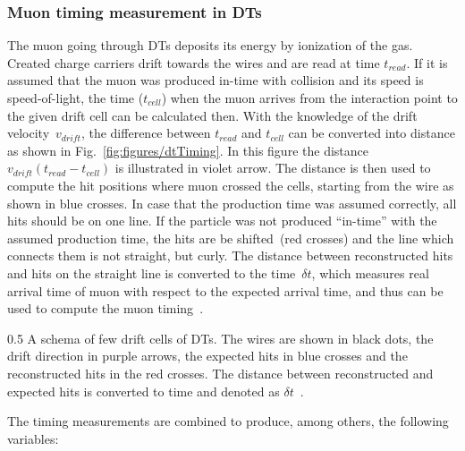 \subsubsection{Muon timing measurement in DTs}

The muon going through DTs deposits its energy by ionization of the gas. Created charge carriers drift towards the wires and are read at time $t_{read}$. If it is assumed that the muon was produced in-time with collision and its speed is speed-of-light, the time ($t_{cell}$) when the muon arrives from the interaction point to the given drift cell can be calculated then. With the knowledge of the drift velocity~$v_{drift}$, the difference between $t_{read}$ and $t_{cell}$ can be converted into distance as shown in Fig.~\ref{fig:figures/dtTiming}. In this figure the distance $ v_{drift} (t_{read} - t_{cell})$ is illustrated in violet arrow. The distance is then used to compute the hit positions where muon crossed the cells, starting from the wire as shown in blue crosses. In case that the production time was assumed correctly, all hits should be on one line. If the particle was not produced ``in-time'' with the assumed production time, the hits are be shifted~(red crosses) and the line which connects them is not straight, but curly. The distance between reconstructed hits and hits on the straight line is converted to the time~$\delta t$, which measures real arrival time of muon with respect to the expected arrival time, and thus can be used to compute the muon timing~\cite{Traczyk:1365029}.


                 {0.5}       %
                 { A schema of few drift cells of DTs. The wires are shown in black dots, the drift direction in purple arrows, the expected hits in blue crosses and the reconstructed hits in the red crosses. The distance between reconstructed and expected hits is converted to time and denoted as $\delta t$~\cite{Traczyk:1365029}. }

The timing measurements are combined to produce, among others, the following variables: 

